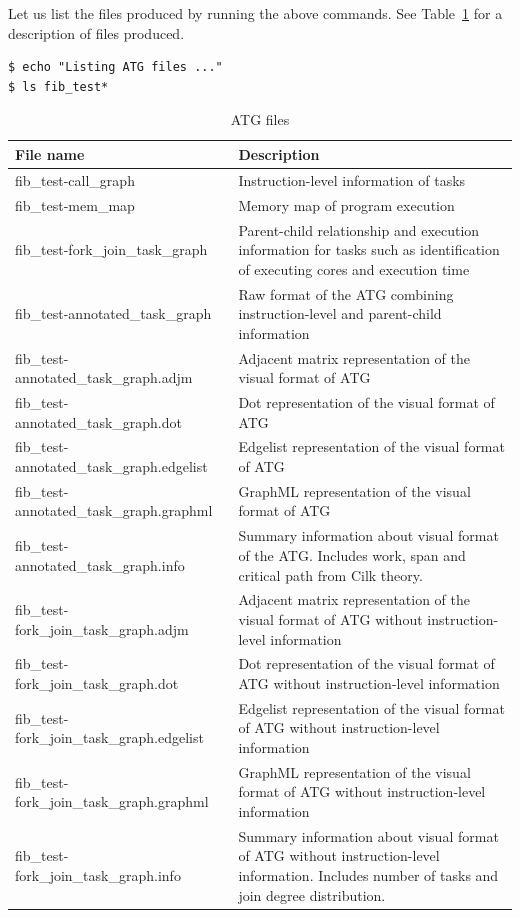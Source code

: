 \documentclass[11pt,a4paper,notitlepage]{article}
\begin{document}
Let us list the files produced by running the above commands. See Table~\ref{tab:atg-files} for a description of files produced.
\begin{lstlisting}[style=BashInputStyle]
$ echo "Listing ATG files ..."
$ ls fib_test*
\end{lstlisting}

\begin{table}[!htb]
\begin{tabular}{|p{5.5cm}|p{7cm}|}
\hline
\textbf{File name} & \textbf{Description} \\ \hline
fib\_test-call\_graph & Instruction-level information of tasks \\ \hline
fib\_test-mem\_map & Memory map of program execution  \\ \hline
fib\_test-fork\_join\_task\_graph & Parent-child relationship and execution information for tasks such as identification of executing cores and execution time \\ \hline
fib\_test-annotated\_task\_graph & Raw format of the ATG combining instruction-level and parent-child information \\ \hline
fib\_test-annotated\_task\_graph.adjm & Adjacent matrix representation of the visual format of ATG \\ \hline
fib\_test-annotated\_task\_graph.dot & Dot representation of the visual format of ATG \\ \hline
fib\_test-annotated\_task\_graph.edgelist & Edgelist representation of the visual format of ATG \\ \hline
fib\_test-annotated\_task\_graph.graphml & GraphML representation of the visual format of ATG \\ \hline
fib\_test-annotated\_task\_graph.info & Summary information about visual format of the ATG. Includes work, span and critical path from Cilk theory. \\ \hline
fib\_test-fork\_join\_task\_graph.adjm & Adjacent matrix representation of the visual format of ATG without instruction-level information \\ \hline
fib\_test-fork\_join\_task\_graph.dot & Dot representation of the visual format of ATG without instruction-level information \\ \hline
fib\_test-fork\_join\_task\_graph.edgelist & Edgelist representation of the visual format of ATG without instruction-level information \\ \hline
fib\_test-fork\_join\_task\_graph.graphml & GraphML representation of the visual format of ATG without instruction-level information \\ \hline
fib\_test-fork\_join\_task\_graph.info & Summary information about visual format of ATG without instruction-level information. Includes number of tasks and join degree distribution. \\ \hline
\end{tabular}
\caption{ATG files}
\label{tab:atg-files}
\end{table}
\end{document}
